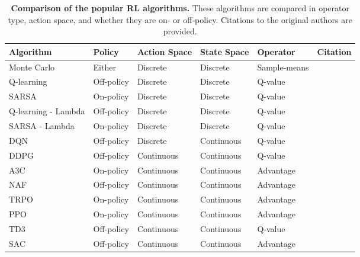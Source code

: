 \newpage\begin{table}[htp!]
    \renewcommand{\arraystretch}{1.4}
    \centering
    \captionsetup{format=hang} %
    \caption{
        \textbf{Comparison of the popular \gls{RL} algorithms.} These algorithms are compared in operator type, action space, and whether they are on- or off-policy. Citations to the original authors are provided.
    }
    \label{tab:rl:algorithms}
    \begin{tabularx}{\textwidth}{lllllX}
            \toprule
            Algorithm           & Policy       & Action Space & State Space & Operator     & Citation                     \\ 
            \midrule
            Monte Carlo         & Either       & Discrete     & Discrete    & Sample-means &                              \\
            Q-learning          & Off-policy   & Discrete     & Discrete    & Q-value      & \cite{Watkins1992}           \\
            SARSA               & On-policy    & Discrete     & Discrete    & Q-value      & \cite{Rummery1994}           \\
            Q-learning - Lambda & Off-policy   & Discrete     & Discrete    & Q-value      &                              \\
            SARSA - Lambda      & On-policy    & Discrete     & Discrete    & Q-value      &                              \\
            DQN                 & Off-policy   & Discrete     & Continuous  & Q-value      & \cite{Mnih2013, Hessel2017}  \\
            DDPG                & Off-policy   & Continuous   & Continuous  & Q-value      & \cite{Lillicrap2015}         \\
            A3C                 & On-policy    & Continuous   & Continuous  & Advantage    & \cite{Mnih2016}              \\
            NAF                 & Off-policy   & Continuous   & Continuous  & Advantage    &                              \\
            TRPO                & On-policy    & Continuous   & Continuous  & Advantage    & \cite{Schulman2015}          \\
            PPO                 & On-policy    & Continuous   & Continuous  & Advantage    & \cite{Schulman2017}          \\
            TD3                 & Off-policy   & Continuous   & Continuous  & Q-value      & \cite{Fujimoto2018}          \\
            SAC                 & Off-policy   & Continuous   & Continuous  & Advantage    & \cite{Haarnoja2018}          \\
            \bottomrule
    \end{tabularx}
\end{table}
    